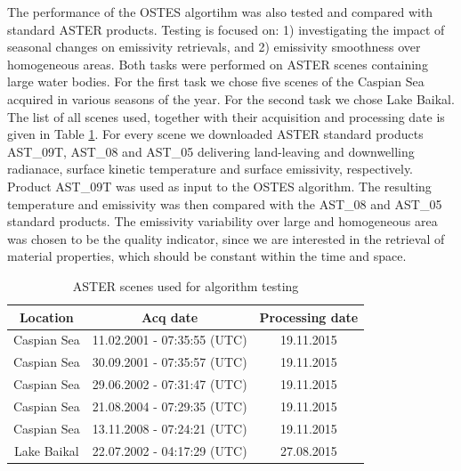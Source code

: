 The performance of the OSTES algortihm was also tested and compared with standard ASTER products. Testing is focused on: 1) investigating the impact of seasonal changes on emissivity retrievals, and 2) emissivity smoothness over homogeneous areas. Both tasks were performed on ASTER scenes containing large water bodies. For the first task we chose five scenes of the Caspian Sea acquired in various seasons of the year. For the second task we chose Lake Baikal. The list of all scenes used, together with their acquisition and processing date is given in Table \ref{table:ASTERScenes}. For every scene we downloaded ASTER standard products AST\_09T, AST\_08 and AST\_05 delivering land-leaving and downwelling radianace, surface kinetic temperature and surface emissivity, respectively. Product AST\_09T was used as input to the OSTES algorithm. The resulting temperature and emissivity was then compared with the AST\_08 and AST\_05 standard products. The emissivity variability over large and homogeneous area was chosen to be the quality indicator, since we are interested in the retrieval of material properties, which should be constant within the time and space.

\begin{table}[!t]
\vspace{0.5em}
\footnotesize
\centering
\begin{tabular}{ccc}
\toprule Location & Acq date & Processing date \\ \hline
Caspian Sea & 11.02.2001 - 07:35:55 (UTC) & 19.11.2015 \\
Caspian Sea & 30.09.2001 - 07:35:57 (UTC) & 19.11.2015 \\
Caspian Sea & 29.06.2002 - 07:31:47 (UTC) & 19.11.2015 \\
Caspian Sea & 21.08.2004 - 07:29:35 (UTC) & 19.11.2015 \\
Caspian Sea & 13.11.2008 - 07:24:21 (UTC) & 19.11.2015 \\
Lake Baikal & 22.07.2002 - 04:17:29 (UTC) & 27.08.2015 \\
\bottomrule
\end{tabular}
\vspace{1.5 em}
\caption{ASTER scenes used for algorithm testing}
\label{table:ASTERScenes}
\normalsize
\end{table}

